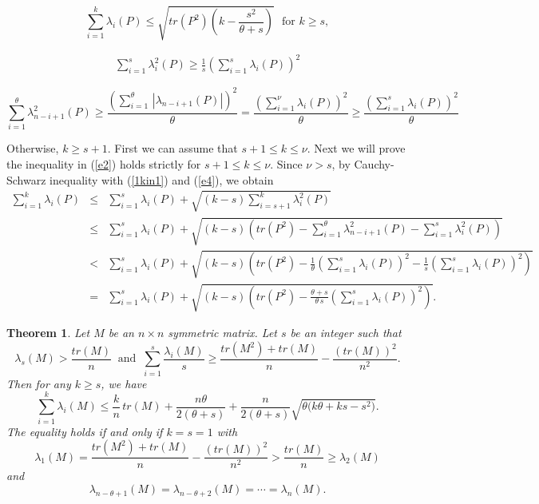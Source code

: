 \documentclass[10pt,a4paper]{amsart}
\newtheorem{theorem}{Theorem}
\begin{document}
 \begin{equation}
 \sum_{i=1}^{k}\lambda_i(P)\leq \sqrt{tr(P^2)\left(k-\frac{s^2}{\theta+s}\right)}~~~\mbox{for } k\geq s, \label{e2}
 \end{equation}

\begin{align}
\sum\limits^{s}_{i=1}\lambda_i^2(P)\geq \frac{1}{s}\left(\sum\limits^{s}_{i=1}\lambda_{i}(P)\right)^2\label{1kin1}
\end{align}

 \begin{equation}
 \sum\limits^{\theta}_{i=1}\lambda_{n-i+1}^2(P)\geq \frac{\left(\sum\limits^{\theta}_{i=1}\,|\lambda_{n-i+1}(P)|\right)^2}{\theta}=\frac{\left(\sum\limits^{\nu}_{i=1}\lambda_{i}(P)\right)^2}{\theta}\geq \frac{\left(\sum\limits^{s}_{i=1}\lambda_{i}(P)\right)^2}{\theta}\label{e4}
 \end{equation}

\noindent
Otherwise, $k\geq s+1$. First we can assume that $s+1\leq k\leq \nu$. Next we will prove the inequality in (\ref{e2}) holds strictly for $s+1\leq k\leq
 \nu$. Since $\nu>s$, by Cauchy-Schwarz inequality with (\ref{1kin1}) and (\ref{e4}), we obtain
 \begin{eqnarray}
 \sum_{i=1}^{k}\lambda_i(P)&\leq&\sum\limits^{s}_{i=1}\lambda_{i}(P)+\sqrt{(k-s)\sum\limits^k_{i=s+1}\lambda_i^2(P)}\nonumber\\[3mm]
 &\leq&\sum\limits^{s}_{i=1}\lambda_{i}(P)+\sqrt{\left(k-s\right)\left(tr(P^2)-\sum\limits^{\theta}_{i=1}\lambda_{n-i+1}^2(P)-\sum\limits^{s}_{i=1}\lambda^2_{i}(P)\right)}\nonumber\\[3mm]
 &<&\sum\limits^{s}_{i=1}\lambda_{i}(P)+\sqrt{\left(k-s\right)\left(tr(P^2)-\frac{1}{\theta}\left(\sum\limits^{s}_{i=1}\lambda_{i}(P)\right)^2-\frac{1}{s}\left(\sum\limits^{s}_{i=1}\lambda_{i}(P)\right)^2\right)} \nonumber\\[3mm]
  &=&\sum\limits^{s}_{i=1}\lambda_{i}(P)+\sqrt{\left(k-s\right)\left(tr(P^2)-\frac{\theta+s}{\theta\,s}\left(\sum\limits^{s}_{i=1}\lambda_{i}(P)\right)^2\right)}. \label{e6}
 \end{eqnarray}

 \begin{theorem} \label{th4} Let $M$ be an $n\times n$ symmetric matrix. Let $s$ be an integer such that 
 $$\lambda_s(M)>\frac{tr(M)}{n}~\mbox{ and }~\sum\limits_{i=1}^s\frac{\lambda_i(M)}{s}\geq \frac{tr(M^2)+tr(M)}{n}-\frac{(tr(M))^2}{n^2}.$$ 
Then for any $k\geq s$, we have
\begin{equation}
 \sum_{i=1}^{k}\lambda_i(M)\leq\frac{k}{n}\,tr(M)+\frac{n\theta}{2(\theta+s)}+\frac{n}{2(\theta+s)}\sqrt{\theta\big(k\theta+ks-s^2\big)}.  \label{nne1}
\end{equation}
The equality holds if and only if $k=s=1$ with 
$$\lambda_1(M)=\frac{tr(M^2)+tr(M)}{n}-\frac{(tr(M))^2}{n^2}>\frac{tr(M)}{n}\geq \lambda_{2}(M)$$ 
and 
$$\lambda_{n-\theta+1}(M)=\lambda_{n-\theta+2}(M)=\cdots=\lambda_n(M).$$
\end{theorem}
\end{document}
